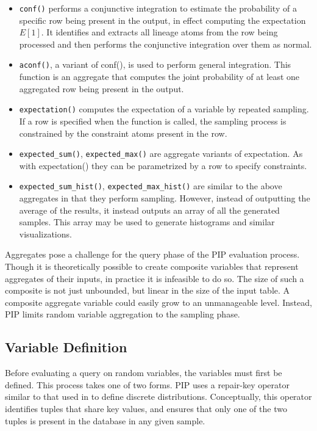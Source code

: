 \begin{itemize}
\item \texttt{conf()} performs a conjunctive integration to estimate the probability of a specific row being present in the output, in effect computing the expectation $E[1]$.  It identifies and extracts all lineage atoms from the row being processed and then performs the conjunctive integration over them as normal.

\item \texttt{aconf()}, a variant of conf(), is used to perform general integration.  This function is an aggregate that computes the joint probability of at least one aggregated row being present in the output.  

\item \texttt{expectation()} computes the expectation of a variable by repeated sampling.  If a row is specified when the function is called, the sampling process is constrained by the constraint atoms present in the row.

\item \texttt{expected\_sum()}, \texttt{expected\_max()} are aggregate variants of expectation.  As with expectation() they can be parametrized by a row to specify constraints.

\item \texttt{expected\_sum\_hist()}, \texttt{expected\_max\_hist()} are similar to the above aggregates in that they perform sampling.  However, instead of outputting the average of the results, it instead outputs an array of all the generated samples.  This array may be used to generate histograms and similar visualizations.
\end{itemize}

Aggregates pose a challenge for the query phase of the PIP evaluation process.  Though it is theoretically possible to create composite variables that represent aggregates of their inputs, in practice it is infeasible to do so.  The size of such a composite is not just unbounded, but linear in the size of the input table.  A composite aggregate variable could easily grow to an unmanageable level.  Instead, PIP limits random variable aggregation to the sampling phase.  





\subsection{Variable Definition}
Before evaluating a query on random variables, the variables must first be defined.  This process takes one of two forms.  PIP uses a repair-key operator similar to that used in \cite{KochMayBMS2008} to define discrete distributions.  Conceptually, this operator identifies tuples that share key values, and ensures that only one of the two tuples is present in the database in any given sample.  

